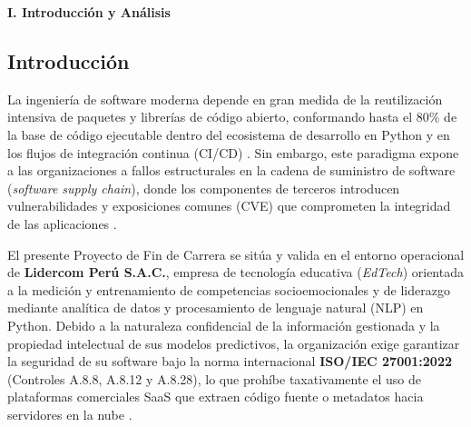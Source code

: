 

\setcounter{section}{1}
\setcounter{subsection}{0}


\begin{center}
    {\normalfont\Large\bfseries I. Introducción y Análisis \par}
\end{center}
\subsection{Introducción}
La ingeniería de software moderna depende en gran medida de la reutilización intensiva de paquetes y librerías de código abierto, conformando hasta el 80\% de la base de código ejecutable dentro del ecosistema de desarrollo en Python y en los flujos de integración continua (CI/CD) \parencite{synopsys2024ossra, decan2019empirical}. %
Sin embargo, este paradigma expone a las organizaciones a fallos estructurales en la cadena de suministro de software (\textit{software supply chain}), donde los componentes de terceros introducen vulnerabilidades y exposiciones comunes (CVE) que comprometen la integridad de las aplicaciones \parencite{ladisa2023sok, owasp2025top10}. %

El presente Proyecto de Fin de Carrera se sitúa y valida en el entorno operacional de \textbf{Lidercom Perú S.A.C.}, empresa de tecnología educativa (\textit{EdTech}) orientada a la medición y entrenamiento de competencias socioemocionales y de liderazgo mediante analítica de datos y procesamiento de lenguaje natural (NLP) en Python. %
Debido a la naturaleza confidencial de la información gestionada y la propiedad intelectual de sus modelos predictivos, la organización exige garantizar la seguridad de su software bajo la norma internacional \textbf{ISO/IEC 27001:2022} (Controles A.8.8, A.8.12 y A.8.28), lo que prohíbe taxativamente el uso de plataformas comerciales SaaS que extraen código fuente o metadatos hacia servidores en la nube \parencite{gutierrez2024auditoria, ladisa2023sok}. %


